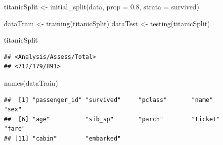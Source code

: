 \documentclass[
]{article}
\newenvironment{Shaded}{\begin{snugshade}}{\end{snugshade}}
\newcommand{\AttributeTok}[1]{\textcolor[rgb]{0.77,0.63,0.00}{#1}}
\newcommand{\FloatTok}[1]{\textcolor[rgb]{0.00,0.00,0.81}{#1}}
\newcommand{\FunctionTok}[1]{\textcolor[rgb]{0.00,0.00,0.00}{#1}}
\newcommand{\NormalTok}[1]{#1}
\newcommand{\OtherTok}[1]{\textcolor[rgb]{0.56,0.35,0.01}{#1}}
\begin{document}
\begin{Shaded}
\begin{Highlighting}[]
\NormalTok{titanicSplit }\OtherTok{\textless{}{-}} \FunctionTok{initial\_split}\NormalTok{(data, }
                              \AttributeTok{prop =} \FloatTok{0.8}\NormalTok{, }
                              \AttributeTok{strata =}\NormalTok{ survived)}

\NormalTok{dataTrain }\OtherTok{\textless{}{-}} \FunctionTok{training}\NormalTok{(titanicSplit)}
\NormalTok{dataTest }\OtherTok{\textless{}{-}} \FunctionTok{testing}\NormalTok{(titanicSplit)}

\NormalTok{titanicSplit}
\end{Highlighting}
\end{Shaded}

\begin{verbatim}
## <Analysis/Assess/Total>
## <712/179/891>
\end{verbatim}

\begin{Shaded}
\begin{Highlighting}[]
\FunctionTok{names}\NormalTok{(dataTrain)}
\end{Highlighting}
\end{Shaded}

\begin{verbatim}
##  [1] "passenger_id" "survived"     "pclass"       "name"         "sex"         
##  [6] "age"          "sib_sp"       "parch"        "ticket"       "fare"        
## [11] "cabin"        "embarked"
\end{verbatim}
\end{document}
